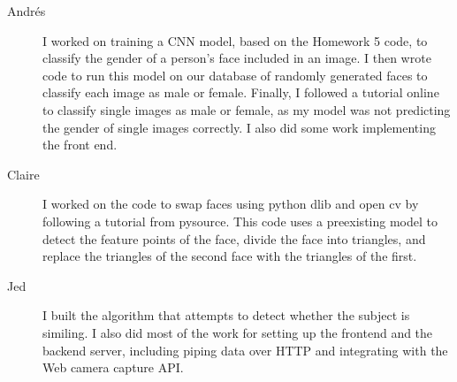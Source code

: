 \begin{description}
\item[Andrés] I worked on training a CNN model, based on the Homework 5 code, to classify the gender of a person's face included in an image. I then wrote code to run this model on our database of randomly generated faces to classify each image as male or female. Finally, I followed a tutorial online to classify single images as male or female, as my model was not predicting the gender of single images correctly. I also did some work implementing the front end.
\item[Claire] I worked on the code to swap faces using python dlib and open cv by following a tutorial from pysource. This code uses a preexisting model to detect the feature points of the face, divide the face into triangles, and replace the triangles of the second face with the triangles of the first.
\item [Jed] I built the algorithm that attempts to detect whether the subject is similing. I also did most of the work for setting up the frontend and the backend server, including piping data over HTTP and integrating with the Web camera capture API.
\end{description}


